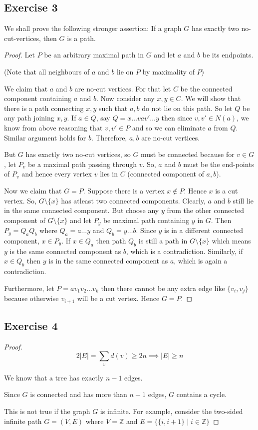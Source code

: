 \documentclass[12pt]{article}
\begin{document}
\subsection*{Exercise 3}
We shall prove the following stronger assertion: If a graph $G$ has exactly two no-cut-vertices, then $G$ is a path.
\begin{proof}
Let $P$ be an arbitrary maximal path in $G$ and let $a$ and $b$ be its endpoints.

(Note that all neighbours of $a$ and $b$ lie on $P$ by maximality of $P$)

We claim that $a$ and $b$ are no-cut vertices. For that let $C$ be the connected component containing $a$ and $b$. Now consider any $x,y  \in C$. We will show that there is a path connecting $x,y$ such that $a, b$ do not lie on this path. So let $Q$ be any path joining $x,y$. If $a \in Q$, say $Q = x \ldots vav' \ldots y$ then since $v,v' \in N(a)$, we know from above reasoning that $v,v' \in P$ and so we can eliminate $a$ from $Q$. Similar argument holds for $b$. Therefore, $a,b$ are no-cut vertices.

But $G$ has exactly two no-cut vertices, so $G$ must be connected because for $v \in G$, let $P_v$ be a maximal path passing through $v$. So, $a$ and $b$ must be the end-points of $P_v$ and hence every vertex $v$ lies in $C$ (connected component of $a,b$).

Now we claim that $G = P$. Suppose there is a vertex $x \not \in P$. Hence $x$ is a cut vertex. So, $G \setminus \{x\}$ has atleast two connected components. Clearly, $a$ and $b$ still lie in the same connected component. But choose any $y$ from the other connected component of $G \setminus \{x\}$ and let $P_y$ be maximal path containing $y$ in $G$. Then $P_y = Q_aQ_b$ where $Q_a = a \ldots y$ and $Q_b = y \ldots b$. Since $y$ is in a different connected component, $x \in P_y$. If $x \in Q_a$ then path $Q_b$ is still a path in $G \setminus \{x\}$ which means $y$ is the same connected component as $b$, which is a contradiction. Similarly, if $x \in Q_b$ then $y$ is in the same connected component as $a$, which is again a contradiction. 

Furthermore, let $P = av_1v_2 \ldots v_k$ then there cannot be any extra edge like $\{v_i, v_j\}$ because otherwise $v_{i+1}$ will be a cut vertex. Hence $G=P$.

\end{proof}

\subsection*{Exercise 4}
\begin{proof}
$$2|E| = \sum_v d(v) \geq 2n \implies |E| \geq n$$

We know that a tree has exactly $n-1$ edges.

Since $G$ is connected and has more than $n-1$ edges, $G$ contains a cycle.

This is not true if the graph $G$ is infinite. For example, consider the two-sided infinite path $G = (V,E)$ where $V = \mathbb{Z}$ and $E = \{\{i,i+1\} \mid i \in \mathbb{Z}\}$
\end{proof}

\vspace{2in} %
\end{document}
